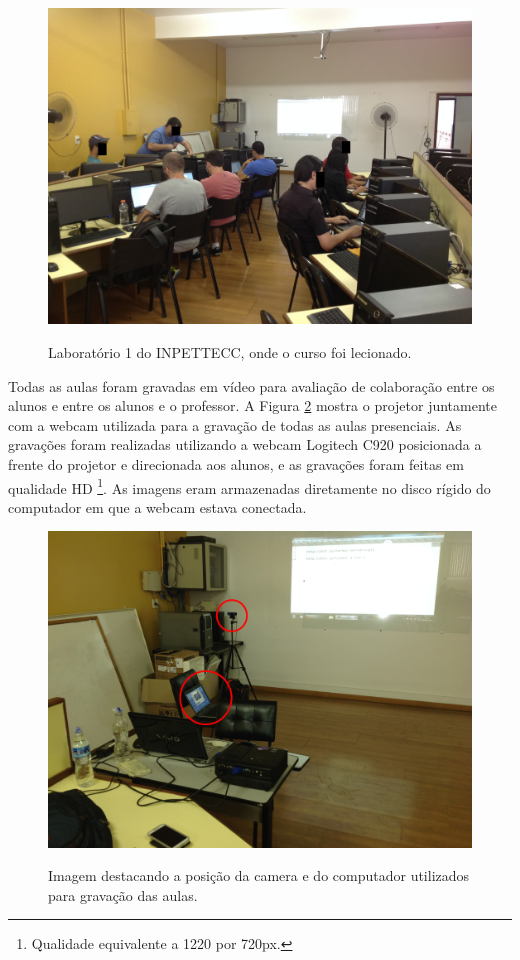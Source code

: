 \begin{figure}[!h]
\centering
\caption{Laboratório 1 do INPETTECC, onde o curso foi lecionado.}
\includegraphics[width=1.0\textwidth]{imgs/lab_1.jpg}
\label{fig:lab_1} 
\end{figure}

Todas as aulas foram gravadas em vídeo para avaliação de colaboração entre os alunos e entre os alunos e o professor. A Figura \ref{fig:lab_2} mostra o projetor juntamente com a webcam utilizada para a gravação de todas as aulas presenciais. As gravações foram realizadas utilizando a webcam Logitech C920 posicionada a frente do projetor e direcionada aos alunos, e as gravações foram feitas em qualidade HD \footnote{Qualidade equivalente a 1220 por 720px.}. As imagens eram armazenadas diretamente no disco rígido do computador em que a webcam estava conectada.

\begin{figure}[!h]
\centering
\caption{Imagem destacando a posição da camera e do computador utilizados para gravação das aulas.}
\includegraphics[width=1.0\textwidth]{imgs/lab_2.jpg}
\label{fig:lab_2} 
\end{figure}

